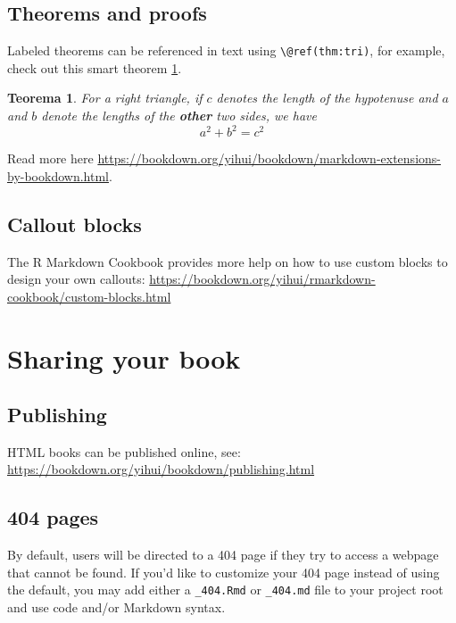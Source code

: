 \documentclass[
]{book}
\newtheorem{theorem}{Teorema}
\begin{document}
\hypertarget{theorems-and-proofs}{%
\section{Theorems and proofs}\label{theorems-and-proofs}}

Labeled theorems can be referenced in text using \texttt{\textbackslash{}@ref(thm:tri)}, for example, check out this smart theorem \ref{thm:tri}.

\begin{theorem}
\protect\hypertarget{thm:tri}{}\label{thm:tri}For a right triangle, if \(c\) denotes the \emph{length} of the hypotenuse
and \(a\) and \(b\) denote the lengths of the \textbf{other} two sides, we have
\[a^2 + b^2 = c^2\]
\end{theorem}

Read more here \url{https://bookdown.org/yihui/bookdown/markdown-extensions-by-bookdown.html}.

\hypertarget{callout-blocks}{%
\section{Callout blocks}\label{callout-blocks}}

The R Markdown Cookbook provides more help on how to use custom blocks to design your own callouts: \url{https://bookdown.org/yihui/rmarkdown-cookbook/custom-blocks.html}

\hypertarget{sharing-your-book}{%
\chapter{Sharing your book}\label{sharing-your-book}}

\hypertarget{publishing}{%
\section{Publishing}\label{publishing}}

HTML books can be published online, see: \url{https://bookdown.org/yihui/bookdown/publishing.html}

\hypertarget{pages}{%
\section{404 pages}\label{pages}}

By default, users will be directed to a 404 page if they try to access a webpage that cannot be found. If you'd like to customize your 404 page instead of using the default, you may add either a \texttt{\_404.Rmd} or \texttt{\_404.md} file to your project root and use code and/or Markdown syntax.
\end{document}
